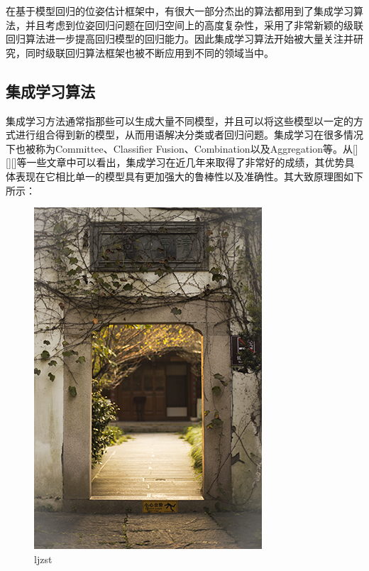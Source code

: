在基于模型回归的位姿估计框架中，有很大一部分杰出的算法都用到了集成学习算法，并且考虑到位姿回归问题在回归空间上的高度复杂性，采用了非常新颖的级联回归算法进一步提高回归模型的回归能力。因此集成学习算法开始被大量关注并研究，同时级联回归算法框架也被不断应用到不同的领域当中。


\subsection{集成学习算法} %

集成学习方法通常指那些可以生成大量不同模型，并且可以将这些模型以一定的方式进行组合得到新的模型，从而用语解决分类或者回归问题\cite{mendes2012ensemble}。集成学习在很多情况下也被称为Committee、Classifier Fusion、Combination以及Aggregation等\cite{valentini2002ensembles}。从[][][]等一些文章中可以看出，集成学习在近几年来取得了非常好的成绩，其优势具体表现在它相比单一的模型具有更加强大的鲁棒性以及准确性\cite{garcia2005cooperative}。其大致原理图如下所示：

\begin{figure}[htb]
	\centering 
	\includegraphics[scale=1.0]{./Pictures/test.jpg} 
	\caption{ljzst} 
\end{figure}


